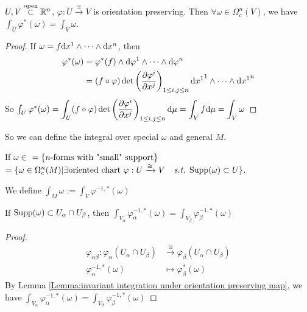 \begin{lemma}\label{Lemma:invariant integration under orientation preserving map}
    $ U,V\overset{\text{open}}{\subset}\mathbb R^n $, $ \varphi:U\xrightarrow{\cong}V $ is orientation preserving. Then  $ \forall \omega\in \Omega_c^n(V) $, we have  $ \int_U\varphi^*(\omega)=\int_V\omega $.    
\end{lemma}
\begin{proof}
   If $ \omega=f\mathrm{d} {x}^1\wedge\cdots\wedge\mathrm{d} {x}^n $, then 
   \begin{equation}
       \begin{aligned}
           \varphi^*(\omega)&=\varphi^*(f)\wedge\mathrm{d} {\varphi}^1\wedge\cdots\wedge\mathrm{d} {\varphi}^n\\
           &=(f\circ\varphi)\det\left(\frac{\partial \varphi^i}{\partial x^j}\right)_{1 \leq i,j \leq n}\mathrm{d} {x^1}^1\wedge\cdots\wedge\mathrm{d} {x^1}^n
       \end{aligned}
   \end{equation}
   So  $ \int_U\varphi^*(\omega)=\displaystyle\int_U (f\circ\varphi)\det\left(\frac{\partial \varphi^i}{\partial x^j}\right)_{1 \leq i,j \leq n}\mathrm{d} \mu=\int_Vf\mathrm{d} \mu=\int_V\omega$ 
     
\end{proof}
So we can define the integral over special  $ \omega $ and  general  $ M $.
\begin{definition}
   If  $ \omega\in  $ $ =\{\text{$ n $-forms with "small" support}\} $ \\ $  = \{\omega\in\Omega_c^n(M)|\exists\text{oriented chart  $ \varphi:U\xrightarrow{ \cong}V $ \st }\Supp(\omega)\subset U\} $.
   
   We define  $ \int_M\omega:=\int_V\varphi^{-1,*}(\omega) $ 
\end{definition} 
\begin{claim}
   If  $ \mathrm{Supp}(\omega)\subset U_\alpha\cap U_\beta $, then  $ \int_{V_\alpha}\varphi_\alpha^{-1,*}(\omega)=\int_{V_\beta}\varphi_\beta^{-1,*}(\omega) $  
\end{claim}
\begin{proof}
   \begin{align*}
       \varphi_{\alpha\beta}:\varphi_\alpha(U_\alpha\cap U_\beta)&\xrightarrow{\cong}\varphi_\beta(U_\alpha\cap U_\beta)\\
       \varphi_\alpha^{-1,*}(\omega)&\mapsto \varphi_\beta^*(\omega)
   \end{align*}
   By Lemma \ref{Lemma:invariant integration under orientation preserving map}, we have  $ \int_{V_\alpha}\varphi_\alpha^{-1,*}(\omega)=\int_{V_\beta}\varphi_\beta^{-1,*}(\omega) $ 
\end{proof}

